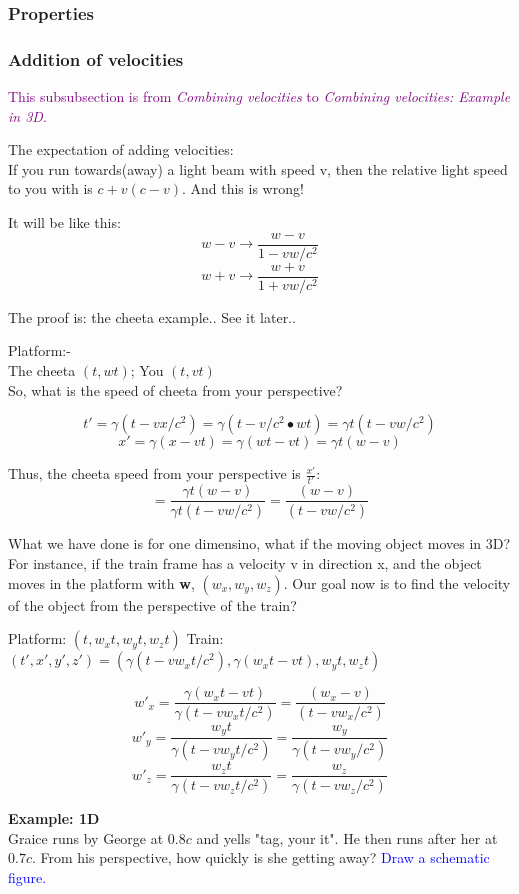 \subsubsection{Properties}
\subsubsection{Addition of velocities}
\textcolor{purple}{This subsubsection is from \textit{Combining velocities} to \textit{Combining velocities: Example in 3D}.}

The expectation of adding velocities: \\
If you run towards(away) a light beam with speed v, then the relative light speed to you with is $c+v(c-v)$. And this is wrong!

It will be like this:
\[ w-v \rightarrow \frac{w-v}{1-vw/c^2}\]
\[ w+v \rightarrow \frac{w+v}{1+vw/c^2}\]

The proof is: the cheeta example.. See it later..

Platform:- \\
The cheeta $(t, wt)$; You $(t, vt)$ \\
So, what is the speed of cheeta from your perspective?

\[ t' = \gamma (t - vx/c^2) = \gamma (t - v/c^2 \bullet wt) = \gamma t(t - vw/c^2) \]
\[ x' = \gamma (x - vt) = \gamma (wt - vt) = \gamma t(w - v) \]

Thus, the cheeta speed from your perspective is $\frac{x'}{t'}$: 
\[ = \frac{\gamma t(w - v)}{\gamma t(t - vw/c^2)} = \frac{(w - v)}{(t - vw/c^2)} \]

What we have done is for one dimensino, what if the moving object moves in 3D? For instance, if the train frame has a velocity v in direction x,
and the object moves in the platform with \textbf{w}, $(w_x, w_y, w_z)$. Our goal now is to find the velocity of the object from the perspective of 
the train?

Platform: $(t, w_x t, w_y t, w_z t)$
Train: $(t', x', y', z') = (\gamma (t-vw_x t/c^2), \gamma (w_x t - vt), w_y t, w_z t)$

\[ w'_x = \frac{\gamma (w_x t - vt)}{\gamma (t-vw_x t/c^2)} = \frac{(w_x - v)}{(t - vw_x/c^2)}\]
\[ w'_y = \frac{w_y t}{\gamma (t-vw_y t/c^2)} = \frac{w_y}{\gamma (t-vw_y/c^2)} \]
\[ w'_z = \frac{w_z t}{\gamma (t-vw_z t/c^2)} = \frac{w_z}{\gamma (t-vw_z/c^2)} \]

\textbf{Example: 1D} \\
Graice runs by George at $0.8c$ and yells "tag, your it". He then runs after her at $0.7c$. From his perspective, how quickly is she getting away?
\textcolor{blue}{Draw a schematic figure.}

